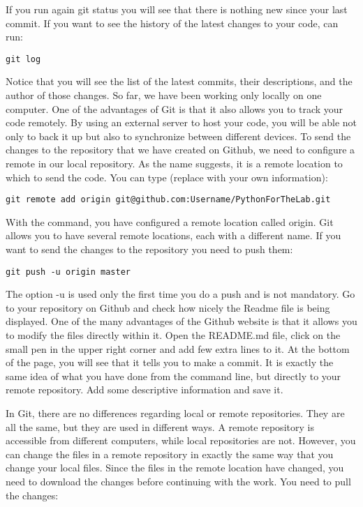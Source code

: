 If you run again git status you will see that there is nothing new since your last commit. If you want to see the history of the latest changes to your code, can run:
\begin{verbatim}
git log 
\end{verbatim}

Notice that you will see the list of the latest commits, their descriptions, and the author of those changes. So far, we have been working only locally on one computer. One of the advantages of Git is that it also allows you to track your code remotely. By using an external server to host your code, you will be able not only to back it up but also to synchronize between different devices. To send the changes to the repository that we have created on Github, we need to configure a remote in our local repository. As the name suggests, it is a remote location to which to send the code. You can type (replace with your own information):
\begin{verbatim}
git remote add origin git@github.com:Username/PythonForTheLab.git
\end{verbatim}

With the command, you have configured a remote location called origin. Git allows you to have several remote locations, each with a different name. If you want to send the changes to the repository you need to push them:
\begin{verbatim}
git push -u origin master 
\end{verbatim}
The option -u is used only the first time you do a push and is not mandatory. Go to your repository on Github and check how nicely the Readme file is being displayed. One of the many advantages of the Github website is that it allows you to modify the files directly within it. Open the README.md file, click on the small pen in the upper right corner and add few extra lines to it. At the bottom of the page, you will see that it tells you to make a commit. It is exactly the same idea of what you have done from the command line, but directly to your remote repository. Add some descriptive information and save it.

In Git, there are no differences regarding local or remote repositories. They are all the same, but they are used in different ways. A remote repository is accessible from different computers, while local repositories are not. However, you can change the files in a remote repository in exactly the same way that you change your local files. Since the files in the remote location have changed, you need to download the changes before continuing with the work. You need to pull the changes:

